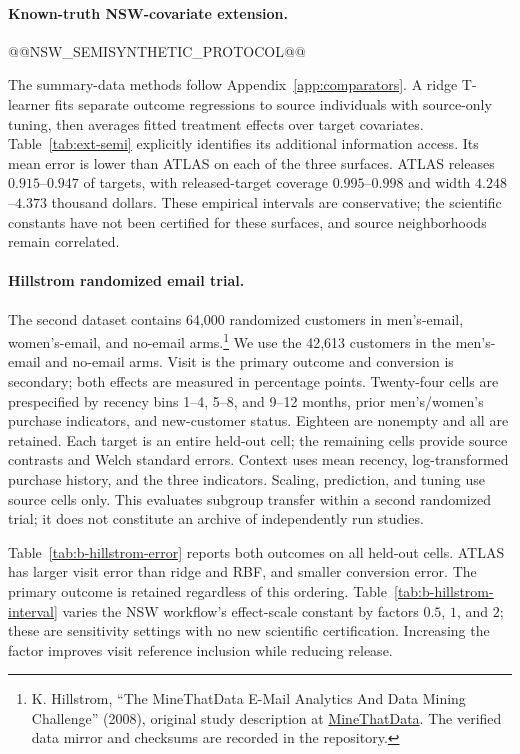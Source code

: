 \paragraph{Known-truth NSW-covariate extension.}
@@NSW_SEMISYNTHETIC_PROTOCOL@@

The summary-data methods follow Appendix~\ref{app:comparators}. A ridge T-learner fits separate outcome regressions to source individuals with source-only tuning, then averages fitted treatment effects over target covariates. Table~\ref{tab:ext-semi} explicitly identifies its additional information access. Its mean error is lower than ATLAS on each of the three surfaces. ATLAS releases $0.915$--$0.947$ of targets, with released-target coverage $0.995$--$0.998$ and width $4.248$--$4.373$ thousand dollars. These empirical intervals are conservative; the scientific constants have not been certified for these surfaces, and source neighborhoods remain correlated.


\paragraph{Hillstrom randomized email trial.}
The second dataset contains 64,000 randomized customers in men's-email, women's-email, and no-email arms.\footnote{K. Hillstrom, ``The MineThatData E-Mail Analytics And Data Mining Challenge'' (2008), original study description at \href{https://blog.minethatdata.com/2008/03/minethatdata-e-mail-analytics-and-data.html}{MineThatData}. The verified data mirror and checksums are recorded in the repository.} We use the 42,613 customers in the men's-email and no-email arms. Visit is the primary outcome and conversion is secondary; both effects are measured in percentage points. Twenty-four cells are prespecified by recency bins 1--4, 5--8, and 9--12 months, prior men's/women's purchase indicators, and new-customer status. Eighteen are nonempty and all are retained. Each target is an entire held-out cell; the remaining cells provide source contrasts and Welch standard errors. Context uses mean recency, log-transformed purchase history, and the three indicators. Scaling, prediction, and tuning use source cells only. This evaluates subgroup transfer within a second randomized trial; it does not constitute an archive of independently run studies.

Table~\ref{tab:b-hillstrom-error} reports both outcomes on all held-out cells. ATLAS has larger visit error than ridge and RBF, and smaller conversion error. The primary outcome is retained regardless of this ordering. Table~\ref{tab:b-hillstrom-interval} varies the NSW workflow's effect-scale constant by factors $0.5$, $1$, and $2$; these are sensitivity settings with no new scientific certification. Increasing the factor improves visit reference inclusion while reducing release.



